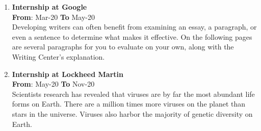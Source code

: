 \documentclass{article}
\begin{document}
{\begin{minipage}[t]{0.5\textwidth}
\begin{enumerate}
	\item {\textbf{Internship at Google}}\\
	\hfill {\textbf{From}}: Mar-20 {\textbf{To}} May-20\\
	Developing writers can often benefit from examining an essay, a paragraph, or even a sentence to determine what makes it effective. On the following pages are several paragraphs for you to evaluate on your own, along with the Writing Center's explanation.
	\item {\textbf{Internship at Lockheed Martin}}\\
	\hfill {\textbf{From}}: May-20 {\textbf{To}} Nov-20\\
	 Scientists research has revealed that viruses are by far the most abundant life forms on Earth. There are a million times more viruses on the planet than stars in the universe. Viruses also harbor the majority of genetic diversity on Earth. 
	
\end{enumerate}

\vspace{5pt}



\end{minipage}%
}
\end{document}
